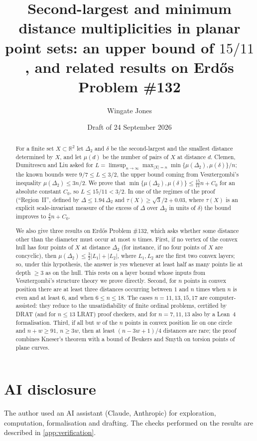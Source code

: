 \documentclass[11pt]{amsart}
\title[Second-largest and minimum distance multiplicities]{Second-largest and minimum distance multiplicities in planar point sets: an upper bound of $15/11$, and related results on Erd\H{o}s Problem \#132}
\author{Wingate Jones}
\date{Draft of 24 September 2026}
\theoremstyle{definition}
\theoremstyle{remark}
\newcommand{\R}{\mathbb{R}}
\newcommand{\Dt}{\Delta_2}
\newcommand{\mult}{\mu}
\begin{document}
\begin{abstract}
For a finite set $X\subset\R^2$ let $\Dt$ and $\delta$ be the second-largest and the smallest distance determined by $X$, and let $\mult(d)$ be the number of pairs of $X$ at distance $d$. Clemen, Dumitrescu and Liu asked for
$L=\limsup_{n\to\infty}\max_{|X|=n}\min\{\mult(\Dt),\mult(\delta)\}/n$; the known bounds were $9/7\le L\le 3/2$, the upper bound coming from Vesztergombi's inequality $\mult(\Dt)\le 3n/2$. We prove that $\min\{\mult(\Dt),\mult(\delta)\}\le \tfrac{15}{11}n+C_0$ for an absolute constant $C_0$, so $L\le 15/11<3/2$. In one of the regimes of the proof (``Region~II'', defined by $\Delta\le1.94\,\Dt$ and $\tau(X)\ge\sqrt3/2+0.03$, where $\tau(X)$ is an explicit scale-invariant measure of the excess of $\Delta$ over $\Dt$ in units of $\delta$) the bound improves to $\tfrac43n+C_0$.

We also give three results on Erd\H{o}s Problem \#132, which asks whether some distance other than the diameter must occur at most $n$ times. First, if no vertex of the convex hull has four points of $X$ at distance $\Dt$ (for instance, if no four points of $X$ are concyclic), then $\mult(\Dt)\le\tfrac32|L_1|+|L_2|$, where $L_1,L_2$ are the first two convex layers; so, under this hypothesis, the answer is yes whenever at least half as many points lie at depth $\ge 3$ as on the hull. This rests on a layer bound whose inputs from Vesztergombi's structure theory we prove directly. Second, for $n$ points in convex position there are at least three distances occurring between $1$ and $n$ times when $n$ is even and at least $6$, and when $6\le n\le18$. The cases $n=11,13,15,17$ are computer-assisted: they reduce to the unsatisfiability of finite ordinal problems, certified by DRAT (and for $n\le13$ LRAT) proof checkers, and for $n=7,11,13$ also by a Lean~4 formalisation. Third, if all but $w$ of the $n$ points in convex position lie on one circle and $n+w\ge91$, $n\ge3w$, then at least $(n-3w+1)/4$ distances are rare; the proof combines Kneser's theorem with a bound of Beukers and Smyth on torsion points of plane curves.
\end{abstract}

\maketitle

\section*{AI disclosure}
The author used an AI assistant (Claude, Anthropic) for exploration, computation, formalisation and drafting. The checks performed on the results are described in \cref{app:verification}.
\end{document}
